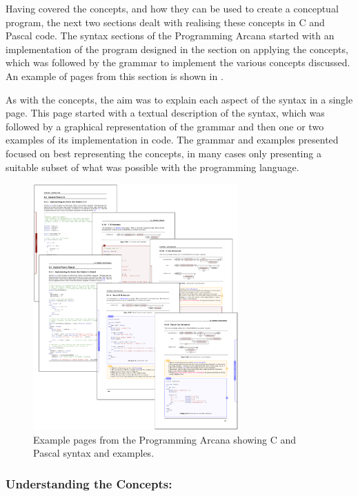 Having covered the concepts, and how they can be used to create a conceptual program, the next two sections dealt with realising these concepts in C and Pascal code. The syntax sections of the Programming Arcana started with an implementation of the program designed in the section on applying the concepts, which was followed by the grammar to implement the various concepts discussed. An example of pages from this section is shown in .

As with the concepts, the aim was to explain each aspect of the syntax in a single page. This page started with a textual description of the syntax, which was followed by a graphical representation of the grammar and then one or two examples of its implementation in code. The grammar and examples presented focused on best representing the concepts, in many cases only presenting a suitable subset of what was possible with the programming language. 

\begin{figure}[h]
  \centering
  \includegraphics[width=0.7\textwidth]{ArcanaSyntax}
  \caption{Example pages from the Programming Arcana showing C and Pascal syntax and examples.}
  \label{fig:arcana_syntax}
\end{figure}


\subsubsection{Understanding the Concepts:} %
\label{par:understanding_the_concepts_}

